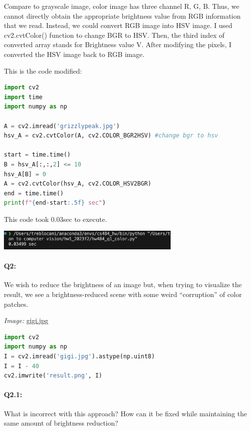 \documentclass[11pt]{article}
\begin{document}
Compare to grayscale image, color image has three channel R, G, B. Thus, we cannot directly obtain the appropriate brightness value from RGB information that we read.
Instead, we could convert RGB image into HSV image. I used cv2.cvtColor() function to change BGR to HSV.
Then, the third index of converted array stands for Brightness value V. After modifying the pixels, I converted the HSV image back to RGB image.

This is the code modified:

\begin{lstlisting}[language=python]
import cv2
import time
import numpy as np

A = cv2.imread('grizzlypeak.jpg')
hsv_A = cv2.cvtColor(A, cv2.COLOR_BGR2HSV) #change bgr to hsv

start = time.time()
B = hsv_A[:,:,2] <= 10
hsv_A[B] = 0
A = cv2.cvtColor(hsv_A, cv2.COLOR_HSV2BGR)
end = time.time()
print(f"{end-start:.5f} sec")
\end{lstlisting}

This code took 0.03sec to execute.

\vspace{1cm}
\centerline{\includegraphics[width=9cm]{color_result.png}}



\pagebreak
\paragraph{Q2:} We wish to reduce the brightness of an image but, when trying to visualize the result, we see a brightness-reduced scene with some weird ``corruption'' of color patches.

\emph{Image:} \href{gigi.jpg}{gigi.jpg}

\begin{lstlisting}[language=Python]
import cv2
import numpy as np
I = cv2.imread('gigi.jpg').astype(np.uint8)
I = I - 40
cv2.imwrite('result.png', I)
\end{lstlisting}

\paragraph{Q2.1:} What is incorrect with this approach? How can it be fixed while maintaining the same amount of brightness reduction?
\end{document}
